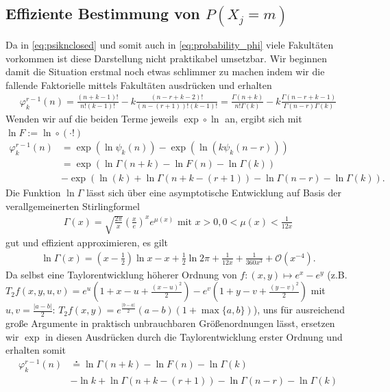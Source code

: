 \documentclass{article}
\begin{document}
\subsection{Effiziente Bestimmung von $P(X_j=m)$}
Da in \ref{eq:psiknclosed} und somit auch in \ref{eq:probability_phi} viele Fakultäten vorkommen ist diese Darstellung nicht praktikabel umsetzbar. Wir beginnen damit die Situation erstmal noch etwas schlimmer zu machen indem wir die fallende Faktorielle mittels Fakultäten ausdrücken und erhalten
\begin{align*}
    \varphi_k^{r-1}(n) = \frac{(n+k-1)!}{n!(k-1)!} - k\frac{(n-r+k-2)!}{(n-(r+1))!(k-1)!} = \frac{\Gamma(n+k)}{n!\Gamma(k)} - k\frac{\Gamma(n-r+k-1)}{\Gamma(n-r)\Gamma(k)}
\end{align*}
Wenden wir auf die beiden Terme jeweils $\exp \circ \ln$ an, ergibt sich mit $\ln F := \ln \circ (\cdot!)$
\begin{align*}
    \varphi_k^{r-1}(n) & = \exp(\ln\psi_k(n)) - \exp(\ln(k\psi_k(n-r)))   \\
                       & = \exp(\ln\Gamma(n+k) - \ln F(n) - \ln\Gamma(k)) \\ &- \exp(\ln(k) + \ln\Gamma(n+k-(r+1)) - \ln\Gamma(n-r) - \ln\Gamma(k)).
\end{align*}
Die Funktion $\ln\Gamma$ lässt sich über eine asymptotische Entwicklung auf Basis der verallgemeinerten Stirlingformel
\begin{align*}
    \Gamma(x) = \sqrt{\frac{2\pi}{x}} \left(\frac{x}{e}\right)^x e^{\mu(x)} \text{ mit }x > 0, 0 < \mu(x) < \frac{1}{12x}
\end{align*}
gut und effizient approximieren, es gilt
\begin{align*}
    \ln\Gamma(x) = (x - \frac{1}{2}) \ln x - x + \frac{1}{2} \ln{2 \pi} + \frac{1}{12 x} + \frac{1}{360 x^3} + \mathcal{O}(x^{-4}).
\end{align*}
Da selbst eine Taylorentwicklung höherer Ordnung von $f : (x,y) \mapsto e^x - e^y$ (z.B. $T_2f(x,y,u,v) = e^u (1+x-u+\frac{(x-u)^2}{2}) - e^v (1+y-v+\frac{(y-v)^2}{2})$ mit $u,v = \frac{|a-b|}{2}$: $T_2f(x,y) = e^{\frac{|b-a|}{2}}(a-b)(1+\max\{a,b\})$), uns für ausreichend große Argumente in praktisch unbrauchbaren Größenordnungen lässt, ersetzen wir $\exp$ in diesen Ausdrücken durch die Taylorentwicklung erster Ordnung und erhalten somit
\begin{align*}
    \varphi_k^{r-1}(n) & \overset{\centerdot}{=} \ln\Gamma(n+k) - \ln F(n) - \ln\Gamma(k) \\ &- \ln k + \ln\Gamma(n+k-(r+1)) - \ln\Gamma(n-r) - \ln\Gamma(k)
\end{align*}
\end{document}
